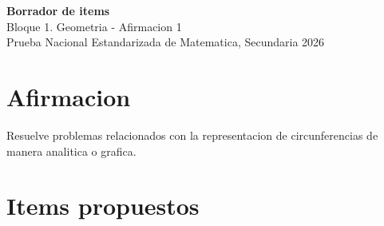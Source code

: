 \documentclass[12pt]{article}
\begin{document}
\begin{center}
  {\Large \textbf{Borrador de items}}\\
  {\large Bloque 1. Geometria - Afirmacion 1}\\[4pt]
  Prueba Nacional Estandarizada de Matematica, Secundaria 2026
\end{center}

\section*{Afirmacion}
Resuelve problemas relacionados con la representacion de circunferencias de manera analitica o grafica.

\section*{Items propuestos}
\end{document}
